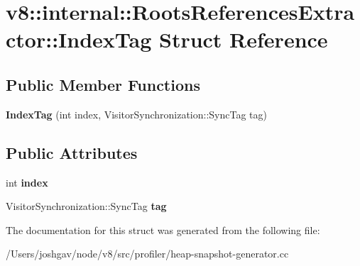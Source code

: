 \hypertarget{structv8_1_1internal_1_1_roots_references_extractor_1_1_index_tag}{}\section{v8\+:\+:internal\+:\+:Roots\+References\+Extractor\+:\+:Index\+Tag Struct Reference}
\label{structv8_1_1internal_1_1_roots_references_extractor_1_1_index_tag}
\subsection*{Public Member Functions}
\begin{DoxyCompactItemize}
\item 
{\bfseries Index\+Tag} (int index, Visitor\+Synchronization\+::\+Sync\+Tag tag)\hypertarget{structv8_1_1internal_1_1_roots_references_extractor_1_1_index_tag_ad328a935379bf2639b682e9651cba888}{}\label{structv8_1_1internal_1_1_roots_references_extractor_1_1_index_tag_ad328a935379bf2639b682e9651cba888}

\end{DoxyCompactItemize}
\subsection*{Public Attributes}
\begin{DoxyCompactItemize}
\item 
int {\bfseries index}\hypertarget{structv8_1_1internal_1_1_roots_references_extractor_1_1_index_tag_a7ce148d185f793d23a5e83cbb636ee1c}{}\label{structv8_1_1internal_1_1_roots_references_extractor_1_1_index_tag_a7ce148d185f793d23a5e83cbb636ee1c}

\item 
Visitor\+Synchronization\+::\+Sync\+Tag {\bfseries tag}\hypertarget{structv8_1_1internal_1_1_roots_references_extractor_1_1_index_tag_a5e1015551c4430b0fe4e0c124e1f8bc6}{}\label{structv8_1_1internal_1_1_roots_references_extractor_1_1_index_tag_a5e1015551c4430b0fe4e0c124e1f8bc6}

\end{DoxyCompactItemize}


The documentation for this struct was generated from the following file\+:\begin{DoxyCompactItemize}
\item 
/\+Users/joshgav/node/v8/src/profiler/heap-\/snapshot-\/generator.\+cc\end{DoxyCompactItemize}
